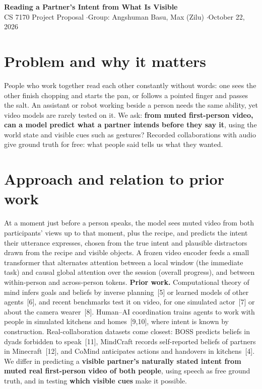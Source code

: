 \documentclass[10pt]{article}
\begin{document}
\small

{\large\bfseries Reading a Partner's Intent from What Is Visible}\\[1pt]
CS 7170 Project Proposal \quad$\cdot$\quad Group: Angshuman Basu, Max (Zilu) \quad$\cdot$\quad October 22, 2026

\section{Problem and why it matters}
People who work together read each other constantly without words: one sees the other finish chopping and starts the pan, or follows a pointed finger and passes the salt. An assistant or robot working beside a person needs the same ability, yet video models are rarely tested on it. We ask: \textbf{from muted first-person video, can a model predict what a partner intends before they say it}, using the world state and visible cues such as gestures? Recorded collaborations with audio give ground truth for free: what people said tells us what they wanted.

\section{Approach and relation to prior work}
At a moment just before a person speaks, the model sees muted video from both participants' views up to that moment, plus the recipe, and predicts the intent their utterance expresses, chosen from the true intent and plausible distractors drawn from the recipe and visible objects. A frozen video encoder feeds a small transformer that alternates attention between a local window (the immediate task) and causal global attention over the session (overall progress), and between within-person and across-person tokens. \textbf{Prior work.} Computational theory of mind infers goals and beliefs by inverse planning~[5] or learned models of other agents~[6], and recent benchmarks test it on video, for one simulated actor~[7] or about the camera wearer~[8]. Human--AI coordination trains agents to work with people in simulated kitchens and homes~[9,10], where intent is known by construction. Real-collaboration datasets come closest: BOSS predicts beliefs in dyads forbidden to speak~[11], MindCraft records self-reported beliefs of partners in Minecraft~[12], and CoMind anticipates actions and handovers in kitchens~[4]. We differ in predicting a \textbf{visible partner's naturally stated intent from muted real first-person video of both people}, using speech as free ground truth, and in testing \textbf{which visible cues} make it possible.
\end{document}
